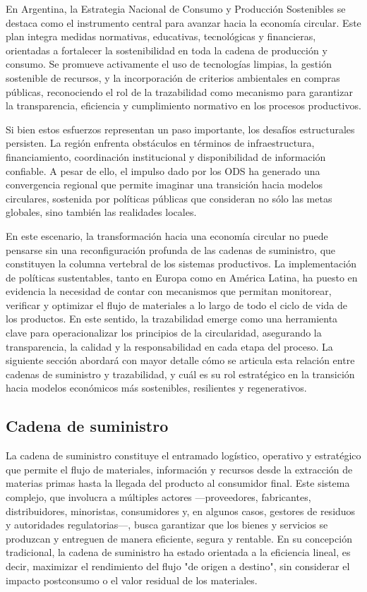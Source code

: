 En Argentina, la Estrategia Nacional de Consumo y Producción Sostenibles se destaca como el instrumento central para avanzar hacia la economía circular. Este plan integra medidas normativas, educativas, tecnológicas y financieras, orientadas a fortalecer la sostenibilidad en toda la cadena de producción y consumo. Se promueve activamente el uso de tecnologías limpias, la gestión sostenible de recursos, y la incorporación de criterios ambientales en compras públicas, reconociendo el rol de la trazabilidad como mecanismo para garantizar la transparencia, eficiencia y cumplimiento normativo en los procesos productivos.

Si bien estos esfuerzos representan un paso importante, los desafíos estructurales persisten. La región enfrenta obstáculos en términos de infraestructura, financiamiento, coordinación institucional y disponibilidad de información confiable. A pesar de ello, el impulso dado por los ODS ha generado una convergencia regional que permite imaginar una transición hacia modelos circulares, sostenida por políticas públicas que consideran no sólo las metas globales, sino también las realidades locales.

En este escenario, la transformación hacia una economía circular no puede pensarse sin una reconfiguración profunda de las cadenas de suministro, que constituyen la columna vertebral de los sistemas productivos. La implementación de políticas sustentables, tanto en Europa como en América Latina, ha puesto en evidencia la necesidad de contar con mecanismos que permitan monitorear, verificar y optimizar el flujo de materiales a lo largo de todo el ciclo de vida de los productos. En este sentido, la trazabilidad emerge como una herramienta clave para operacionalizar los principios de la circularidad, asegurando la transparencia, la calidad y la responsabilidad en cada etapa del proceso. La siguiente sección abordará con mayor detalle cómo se articula esta relación entre cadenas de suministro y trazabilidad, y cuál es su rol estratégico en la transición hacia modelos económicos más sostenibles, resilientes y regenerativos.

\subsection{Cadena de suministro}

La cadena de suministro constituye el entramado logístico, operativo y estratégico que permite el flujo de materiales, información y recursos desde la extracción de materias primas hasta la llegada del producto al consumidor final. Este sistema complejo, que involucra a múltiples actores —proveedores, fabricantes, distribuidores, minoristas, consumidores y, en algunos casos, gestores de residuos y autoridades regulatorias—, busca garantizar que los bienes y servicios se produzcan y entreguen de manera eficiente, segura y rentable. En su concepción tradicional, la cadena de suministro ha estado orientada a la eficiencia lineal, es decir, maximizar el rendimiento del flujo "de origen a destino", sin considerar el impacto postconsumo o el valor residual de los materiales.


